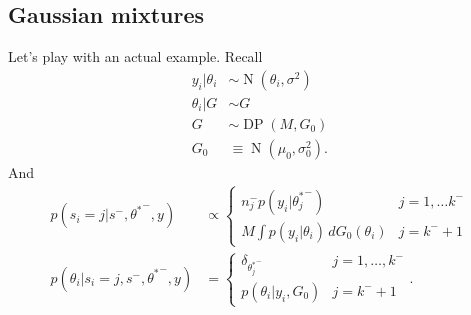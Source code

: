 \documentclass[11pt]{article}
\newcommand{\opn}{\operatorname}
\begin{document}
\subsection{Gaussian mixtures}
Let's play with an actual example. Recall
\begin{align}
  y_{i}|\theta_{i} &\sim \opn{N}\left(\theta_{i},\sigma^{2}\right)\\
  \theta_{i}|G &\sim G\\
  G &\sim \opn{DP}\left(M, G_{0}\right)\\
  G_{0} &\equiv \opn{N}\left(\mu_{0},\sigma_{0}^{2}\right).
\end{align}
And
\begin{align}
  p\left(s_{i}=j|s^{-},{\theta^{*}}^{-}, y\right) &\propto \begin{cases}n_{j}^{-}p\left(y_{i}|{\theta_{j}^{*}}^{-}\right) & j = 1, \ldots k^{-}\\ M\int p\left(y_{i}|\theta_{i}\right)\,dG_{0}\left(\theta_{i}\right) & j = k^{-}+1 \end{cases}\\
  p\left(\theta_{i}|s_{i}=j, s^{-}, {\theta^{*}}^{-}, y\right) &= \begin{cases}\delta_{{\theta_{j}^{*}}^{-}} & j = 1, \ldots , k^{-}\\ p\left(\theta_{i}|y_{i}, G_{0}\right) & j = k^{-} + 1 \end{cases}.
\end{align}
\end{document}
